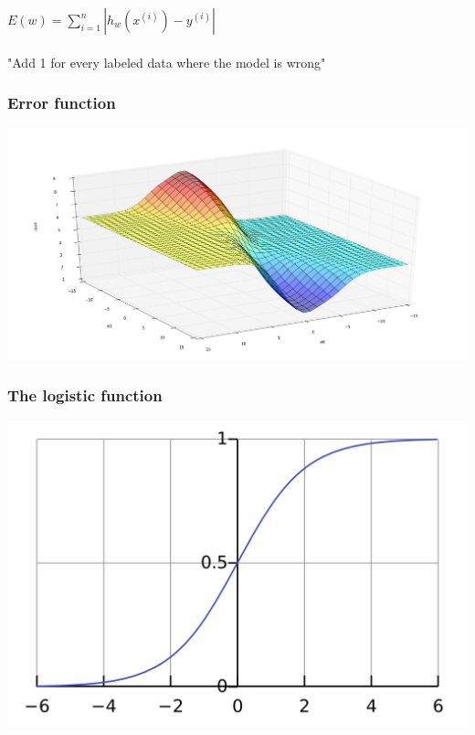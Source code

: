   \begin{frame}
    \begin{center}
      $E(w) = \displaystyle\sum_{i = 1}^n{|h_w(x^{(i)}) - y^{(i)}|}$ \\~\\
      "Add 1 for every labeled data where the model is wrong"
    \end{center}
  \end{frame}

  \begin{frame}
    \frametitle{Error function}
    \begin{center}
      \includegraphics[scale=0.22]{./pictures/error_abs.png}
    \end{center}
  \end{frame}

    \begin{frame}
      \frametitle{The logistic function}
      \begin{center}
        \includegraphics[scale=0.14]{./pictures/sigmoid.png}
      \end{center}
    \end{frame}

